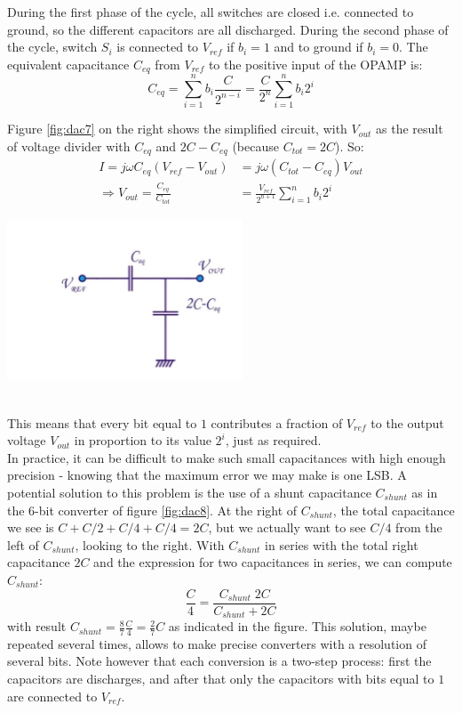 During the first phase of the cycle, all switches are closed i.e. connected to ground, so the different capacitors are all discharged. During the second phase of the cycle, switch $S_i$ is connected to $V_{ref}$ if $b_i = 1$ and to ground if $b_i = 0$. The equivalent capacitance $C_{eq}$ from $V_{ref}$ to the positive input of the OPAMP is:
$$
C_{eq} = \sum_{i=1}^{n} b_i \frac{C}{2^{n-i}} = \frac{C}{2^n} \sum_{i=1}^{n} b_i 2^i
$$

\begin{minipage}{.5\textwidth}
	Figure \ref{fig:dac7} on the right shows the simplified circuit, with $V_{out}$ as the result of voltage divider with $C_{eq}$ and $2C-C_{eq}$ (because $C_{tot} = 2 C$). So:
	\begin{align*}
		I = j\omega C_{eq} (V_{ref} - V_{out}) &= j \omega (C_{tot}-C_{eq}) V_{out} \\
		\Rightarrow V_{out} = \frac{C_{eq}}{C_{tot}} &= \frac{V_{ref}}{2^{n+1}} \sum_{i=1}^n b_i 2^i 
	\end{align*}
\end{minipage}
\begin{minipage}{.5\textwidth}
	\centering
	\includegraphics[width=7cm]{figures/ch18/dac7.jpg}
	\label{fig:dac7}
\end{minipage}\\
This means that every bit equal to $1$ contributes a fraction of $V_{ref}$ to the output voltage $V_{out}$ in proportion to its value $2^i$, just as required. \\
In practice, it can be difficult to make such small capacitances with high enough precision - knowing that the maximum error we may make is one LSB. A potential solution to this problem is the use of a shunt capacitance $C_{shunt}$ as in the $6$-bit converter of figure \ref{fig:dac8}. At the right of $C_{shunt}$, the total capacitance we see is $C + C/2 + C/4 + C/4 = 2C$, but we actually want to see $C/4$ from the left of $C_{shunt}$, looking to the right. With $C_{shunt}$ in series with the total right capacitance $2C$ and the expression for two capacitances in series, we can compute $C_{shunt}$:
$$\frac{C}{4} = \frac{C_{shunt} \; 2C}{C_{shunt} + 2C}$$
with result $C_{shunt} = \frac{8}{7} \frac{C}{4} = \frac{2}{7} C$ as indicated in the figure. This solution, maybe repeated several times, allows to make precise converters with a resolution of several bits. Note however that each conversion is a two-step process: first the capacitors are discharges, and after that only the capacitors with bits equal to $1$ are connected to $V_{ref}$.

